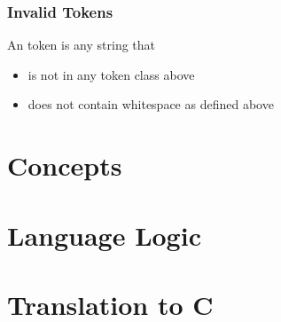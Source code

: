 \documentclass{article}
\begin{document}
\subsubsection{Invalid Tokens}
An \tinv token is any string that
\begin{itemize}
    \item is not in any token class above
    \item does not contain whitespace as defined above
\end{itemize}

\section{Concepts}
\section{Language Logic}
\section{Translation to C}
\end{document}
